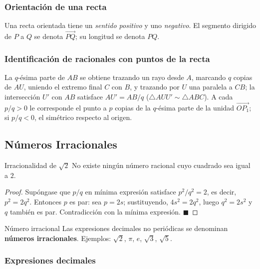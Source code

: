 \documentclass[12pt]{article}
\begin{document}
\subsubsection{Orientación de una recta}

Una recta orientada tiene un \textit{sentido positivo} y uno \textit{negativo}. El segmento dirigido de $P$ a $Q$ se denota $\overrightarrow{PQ}$; su longitud se denota $PQ$.

\subsubsection{Identificación de racionales con puntos de la recta}

La $q$-ésima parte de $AB$ se obtiene trazando un rayo desde $A$, marcando $q$ copias de $AU$, uniendo el extremo final $C$ con $B$, y trazando por $U$ una paralela a $CB$; la intersección $U'$ con $AB$ satisface $AU' = AB/q$ ($\triangle AUU' \sim \triangle ABC$). A cada $p/q > 0$ le corresponde el punto a $p$ copias de la $q$-ésima parte de la unidad $\overrightarrow{OP_1}$; si $p/q < 0$, el simétrico respecto al origen.

\subsection{Números Irracionales}

\begin{proposicion}[]{Irracionalidad de $\sqrt{2}$}
No existe ningún número racional cuyo cuadrado sea igual a $2$.
\end{proposicion}

\begin{proof}
Supóngase que $p/q$ en mínima expresión satisface $p^2/q^2 = 2$, es decir, $p^2 = 2q^2$. Entonces $p$ es par: sea $p = 2s$; sustituyendo, $4s^2 = 2q^2$, luego $q^2 = 2s^2$ y $q$ también es par. Contradicción con la mínima expresión.
$\blacksquare$
\end{proof}

\begin{definicion}[]{Número irracional}
Las expresiones decimales no periódicas se denominan \textbf{números irracionales}. Ejemplos: $\sqrt{2}$, $\pi$, $e$, $\sqrt{3}$, $\sqrt{5}$.
\end{definicion}

\subsubsection{Expresiones decimales}
\end{document}
